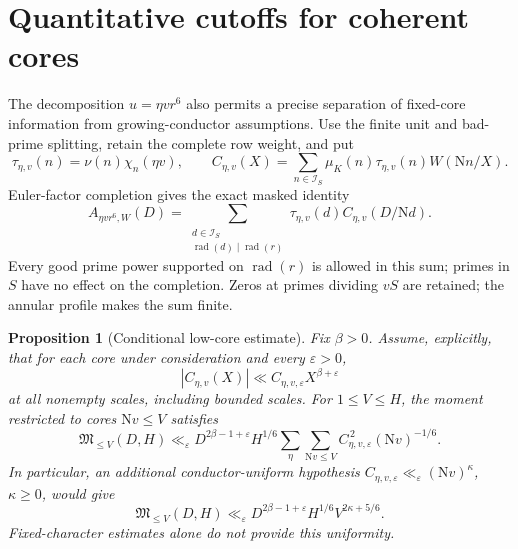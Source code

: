\documentclass[11pt]{article}
\numberwithin{equation}{section}
\newtheorem{proposition}[theorem]{Proposition}
\theoremstyle{definition}
\theoremstyle{remark}
\newcommand{\N}{\mathrm N}
\newcommand{\good}{\mathcal I_S}
\begin{document}
\section{Quantitative cutoffs for coherent cores}
\label{sfac:subsec:cores}

The decomposition $u=\eta vr^6$ also permits a precise separation of
fixed-core information from growing-conductor assumptions.  Use the
finite unit and bad-prime splitting, retain the complete row weight,
and put
\[
 \tau_{\eta,v}(n)=\nu(n)\chi_n(\eta v),\qquad
 C_{\eta,v}(X)=\sum_{n\in\good}
      \mu_K(n)\tau_{\eta,v}(n)W(\N n/X).
\]
Euler-factor completion gives the exact masked identity
\begin{equation}
 A_{\eta vr^6,W}(D)=
   \sum_{\substack{d\in\good\\
                  \operatorname{rad}(d)\mid\operatorname{rad}(r)}}
       \tau_{\eta,v}(d)C_{\eta,v}(D/\N d).
 \label{sfac:eq:core-completion}
\end{equation}
Every good prime power supported on $\operatorname{rad}(r)$ is allowed
in this sum; primes in $S$ have no effect on the completion.  Zeros at primes dividing $vS$ are retained; the annular
profile makes the sum finite.

\begin{proposition}[Conditional low-core estimate]
\label{sfac:prop:core-cutoff}
Fix $\beta>0$.  Assume, explicitly, that for each core under
consideration and every $\varepsilon>0$,
\begin{equation}
 |C_{\eta,v}(X)|\ll
 C_{\eta,v,\varepsilon}X^{\beta+\varepsilon}
 \label{sfac:eq:core-hypothesis}
\end{equation}
at all nonempty scales, including bounded scales.  For $1\le V\le H$,
the moment restricted to cores $\N v\le V$ satisfies
\begin{equation}
 \mathfrak M_{\le V}(D,H)\ll_\varepsilon
 D^{2\beta-1+\varepsilon}H^{1/6}
       \sum_\eta\sum_{\N v\le V}
           C_{\eta,v,\varepsilon}^{\,2}(\N v)^{-1/6}.
 \label{sfac:eq:low-core}
\end{equation}
In particular, an additional conductor-uniform hypothesis
$C_{\eta,v,\varepsilon}\ll_\varepsilon(\N v)^\kappa$, $\kappa\ge0$,
would give
\begin{equation}
 \mathfrak M_{\le V}(D,H)\ll_\varepsilon
   D^{2\beta-1+\varepsilon}H^{1/6}V^{2\kappa+5/6}.
 \label{sfac:eq:low-core-uniform}
\end{equation}
Fixed-character estimates alone do not provide this uniformity.
\end{proposition}
\end{document}

